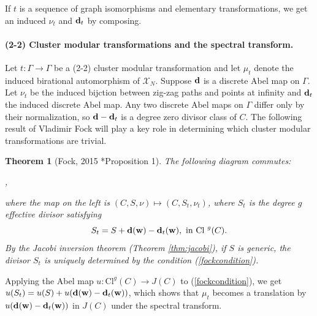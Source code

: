 \documentclass[11pt]{article} %
\newtheorem{theorem}{Theorem}[section]
\theoremstyle{definition}
\newcommand{\ra}{\rightarrow}
\newcommand{\be}{\begin{equation}}
\newcommand{\ee}{\end{equation}}
\newcommand{\la}{\label}
\begin{document}
If $t$ is a sequence of graph isomorphisms and elementary transformations, we get an induced $\nu_t$ and ${\bf d}_t$ by composing.

\paragraph{(2-2) Cluster modular transformations and the spectral transform.}
Let $t: \Gamma \ra \Gamma$ be a (2-2) cluster modular transformation and let $\mu_t$ denote the induced birational automorphism of $\mathcal X_N$. Suppose ${\bf d}$ is a discrete Abel map on $\Gamma$. Let $\nu_t$ be the induced bijction between zig-zag paths and points at infinity and ${\bf d}_t$ the induced discrete Abel map. Any two discrete Abel maps on $\Gamma$ differ only by their normalization, so ${\bf d}-{\bf d}_t$ is a degree zero divisor class of $C$. The following result of Vladimir Fock will play a key role in determining which cluster modular transformations are trivial.

\begin{theorem}[Fock, 2015 \cite{F15}*{Proposition 1}]\label{fockthm}
The following diagram commutes:
\begin{center}
,
\end{center}
where the map on the left is $(C,S,\nu) \mapsto (C,S_t,\nu_t)$, where $S_t$ is the degree $g$ effective divisor satisfying
\be
S_t = S+{\bf d}({\bf w})-{\bf d}_t({\bf w}), \text{ in Cl }^g(C). \la{fockcondition}
\ee
By the Jacobi inversion theorem (Theorem \ref{thm:jacobi}), if $S$ is generic, the divisor $S_t$ is uniquely determined by the condition (\ref{fockcondition}).

\end{theorem}
Applying the Abel map $u:\text{Cl}^g(C) \ra J(C)$ to (\ref{fockcondition}), we get $u(S_t) = u(S)+ u({\bf d}({\bf w})-{\bf d}_t({\bf w}))$, which shows that $\mu_t$ becomes a translation by $u({\bf d}({\bf w})-{\bf d}_t({\bf w}))$ in $J(C)$ under the spectral transform.
\end{document}
